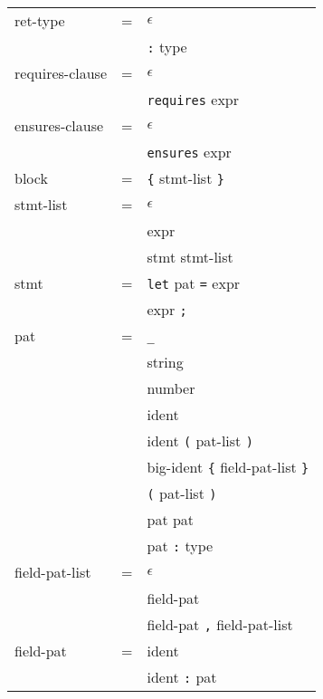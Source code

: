 \documentclass[12pt]{article}
\newcommand{\E}[0]{$\epsilon$}
\newcommand{\T}[1]{\texttt{#1}}
\newcommand{\N}[1]{\textlangle#1\textrangle}
\begin{document}
\begin{tabular}{lll}
\N{ret-type} & =
  & \E \\
& & \T{:} \N{type} \\
\N{requires-clause} & =
  & \E \\
& & \T{requires} \N{expr} \\
\N{ensures-clause} & =
  & \E \\
& & \T{ensures} \N{expr} \\
\N{block} & =
  & \T{\{} \N{stmt-list} \T{\}} \\
\N{stmt-list} & =
  & \E \\
& & \N{expr} \\
& & \N{stmt} \N{stmt-list} \\
\N{stmt} & =
  & \T{let} \N{pat} \T{=} \N{expr} \\
& & \N{expr} \T{;} \\
\N{pat} & =
  & \T{\_} \\
& & \N{string} \\
& & \N{number} \\
& & \N{ident} \\
& & \N{ident} \T{(} \N{pat-list} \T{)} \\
& & \N{big-ident} \T{\{} \N{field-pat-list} \T{\}} \\
& & \T{(} \N{pat-list} \T{)} \\
& & \N{pat} \T{\textbar} \N{pat} \\
& & \N{pat} \T{:} \N{type} \\
\N{field-pat-list} & =
  & \E \\
& & \N{field-pat} \\
& & \N{field-pat} \T{,} \N{field-pat-list} \\
\N{field-pat} & =
  & \N{ident} \\
& & \N{ident} \T{:} \N{pat} \\
\end{tabular}
\end{document}
